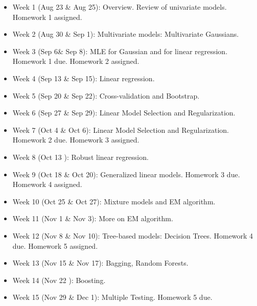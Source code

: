 \documentclass[a4paper,10pt]{article}
\begin{document}
\begin{itemize}

\item Week 1 (Aug 23 \& Aug 25):  Overview.  Review of univariate models. Homework 1 assigned. 

\item Week 2 (Aug 30 \& Sep 1): Multivariate models: Multivariate Gaussians.

\item Week 3 (Sep 6\& Sep 8):   MLE for Gaussian and for linear regression. Homework 1 due. Homework 2 assigned.

\item Week 4 (Sep 13 \& Sep 15):  Linear regression.

\item Week 5 (Sep 20 \& Sep 22): Cross-validation and Bootstrap.

\item Week 6 (Sep 27 \& Sep 29): Linear Model Selection and Regularization.

\item Week 7 (Oct 4 \& Oct 6): Linear Model Selection and Regularization. Homework 2 due. Homework 3 assigned.

\item Week 8 (Oct 13 ):  Robust linear regression.

\item Week 9 (Oct 18 \& Oct 20):  Generalized linear models. Homework 3 due. Homework 4 assigned.

\item Week 10 (Oct 25 \& Oct 27):   Mixture models and EM algorithm.

\item Week 11 (Nov 1 \& Nov 3):   More on EM algorithm.

\item Week 12 (Nov 8 \& Nov 10): Tree-based models: Decision Trees.   Homework 4 due. Homework 5 assigned. 

\item Week 13 (Nov 15 \& Nov 17):  Bagging, Random Forests.

\item Week 14 (Nov 22 ): Boosting. 

\item Week 15 (Nov 29 \& Dec 1): Multiple Testing.  Homework 5 due. 
 
\end{itemize}
\end{document}
